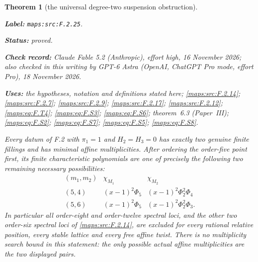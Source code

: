 \documentclass[11pt,a4paper]{article}
\newtheorem{theorem}{Theorem}[section]
\theoremstyle{definition}
\newcommand{\StatementRecord}[4]{\par\smallskip\begingroup\upshape\raggedright\noindent\textbf{Label:} \nolinkurl{#1}.\par\noindent\textbf{Status:} #2.\par\noindent\textbf{Check record:} #3.\par\noindent\textbf{Uses:} #4.\par\endgroup\smallskip}
\newcommand{\CurrentChecker}{GPT-6 Astra (OpenAI, ChatGPT Pro mode, effort Pro), 18 November 2026}
\newcommand{\ExternalPaperRef}[3]{\ifmmode\text{\upshape #1#2 (Paper~#3)}\else #1#2 (Paper~#3)\fi}
\begin{document}
\begin{theorem}[the universal degree-two suspension obstruction]\label{maps:src:F.2.25}
\StatementRecord{maps:src:F.2.25}{proved}{Claude Fable 5.2 (Anthropic), effort high, 16 November 2026; also checked in this writing by \CurrentChecker}{the hypotheses, notation and definitions stated here; \cref{maps:src:F.2.14}; \cref{maps:src:F.2.7}; \cref{maps:src:F.2.9}; \cref{maps:src:F.2.17}; \cref{maps:src:F.2.12}; \cref{maps:eq:F.T4}; \cref{maps:eq:F.S3}; \cref{maps:eq:F.S6}; \ExternalPaperRef{theorem~}{6.3}{III}; \cref{maps:eq:F.S2}; \cref{maps:eq:F.S7}; \cref{maps:eq:F.S5}; \cref{maps:eq:F.S8}}


Every datum of F.2 with $\pi_1=1$ and $H_2=H_3=0$ has
exactly two genuine finite fillings and has minimal affine
multiplicities.  After ordering the order-five point first,
its finite characteristic polynomials are one of precisely
the following two remaining necessary possibilities:
\[
\begin{array}{c|c|c}
 (m_1,m_2)&\chi_{M_1}&\chi_{M_2}\\\hline
 (5,4)&(x-1)^2\Phi_5&(x-1)^2\Phi_2^2\Phi_4\\
 (5,6)&(x-1)^2\Phi_5&(x-1)^2\Phi_2^2\Phi_3.
\end{array}
 \tag{F.S1}\label{maps:eq:F.S1}
\]
In particular all order-eight and order-twelve spectral
loci, and the other two order-six spectral loci of \ref{maps:src:F.2.14},
are excluded for every rational relative position, every
stable lattice and every free affine twist.
There is no multiplicity search bound in this statement:
the only possible actual affine multiplicities are the
two displayed pairs.

\end{theorem}
\end{document}
